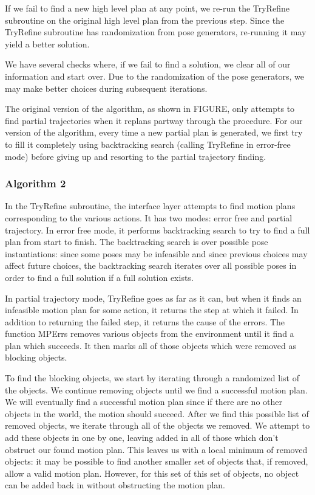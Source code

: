 \documentclass[12pt]{article}
\begin{document}
If we fail to find a new high level plan at any point, we re-run the TryRefine subroutine on the original high level plan from the previous step.  
Since the TryRefine subroutine has randomization from pose generators, re-running it may yield a better solution. 

We have several checks where, if we fail to find a solution, we clear all of our information and start over.  Due to the randomization of the pose generators, we may make better choices during subsequent iterations.  

The original version of the algorithm, as shown in FIGURE, only attempts to find partial trajectories when it replans partway through the procedure.  For our version of the algorithm, every time a new partial plan is generated, we first try to fill it completely using backtracking search (calling TryRefine in error-free mode) before giving up and resorting to the partial trajectory finding.  

\subsubsection{Algorithm 2}


In the TryRefine subroutine, the interface layer attempts to find motion plans corresponding to the various actions.  
It has two modes: error free and partial trajectory.  
In error free mode, it performs backtracking search to try to find a full plan from start to finish.  
The backtracking search is over possible pose instantiations: since some poses may be infeasible and since previous choices may affect future choices, the backtracking search iterates over all possible poses in order to find a full solution if a full solution exists.  

In partial trajectory mode, TryRefine goes as far as it can, but when it finds an infeasible motion plan for some action, it returns the step at which it failed.  
In addition to returning the failed step, it returns the cause of the errors.  
The function MPErrs removes various objects from the environment until it find a plan which succeeds.  
It then marks all of those objects which were removed as blocking objects.

To find the blocking objects, we start by iterating through a randomized list of the objects.  We continue removing objects until we find a successful motion plan.  
We will eventually find a successful motion plan since if there are no other objects in the world, the motion should succeed.  
After we find this possible list of removed objects, we iterate through all of the objects we removed.  
We attempt to add these objects in one by one, leaving added in all of those which don't obstruct our found motion plan.  
This leaves us with a local minimum of removed objects: it may be possible to find another smaller set of objects that, if removed, allow a valid motion plan.  
However, for this set of this set of objects, no object can be added back in without obstructing the motion plan.
\end{document}
